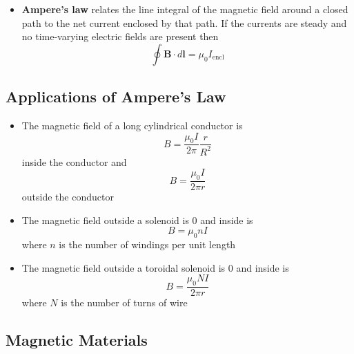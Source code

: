 \documentclass{article}
\begin{document}
\begin{itemize}
  \item \textbf{Ampere's law} relates the line integral of the magnetic field around a closed path to the net current enclosed by that path. If the currents are steady and no time-varying electric fields are present then \[\oint \mathbf{B} \cdot d\mathbf{l} = \mu_0 I_\textrm{encl}\]
\end{itemize}

\subsection{Applications of Ampere's Law}

\begin{itemize}
  \item The magnetic field of a long cylindrical conductor is \[B = \frac{\mu_0 I}{2 \pi} \frac{r}{R^2}\] inside the conductor and \[B = \frac{\mu_0 I}{2 \pi r}\] outside the conductor

  \item The magnetic field outside a solenoid is $0$ and inside is \[B = \mu_0 n I\] where $n$ is the number of windings per unit length

  \item The magnetic field outside a toroidal solenoid is $0$ and inside is \[B = \frac{\mu_0 N I}{2 \pi r}\] where $N$ is the number of turns of wire
\end{itemize}

\subsection{Magnetic Materials}
\end{document}
